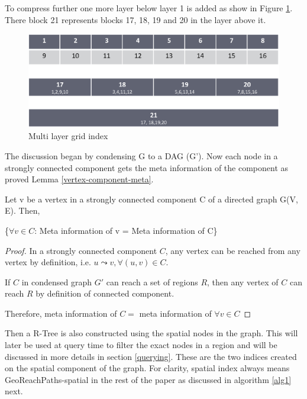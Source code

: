 To compress further one more layer below layer 1 is added as show in Figure \ref{fig:multi-grid2}. There block 21 represents blocks 17, 18, 19 and 20 in the layer above it. 

\begin{figure}[t]
    \centering
    \includegraphics[width=0.88\linewidth]{images/multi_layer_grid_index.eps}
    \caption{Multi layer grid index}
    \label{fig:multi-grid2}
\end{figure}

The discussion began by condensing G to a DAG (G'). Now each node in a strongly connected component gets the meta information of the component as proved Lemma \ref{vertex-component-meta}.

\begin{lemma}
\label{vertex-component-meta}
Let v be a vertex in a strongly connected component C of a directed graph G(V, E). Then,

{\{$\forall v \in C$: Meta information of v = Meta information of C\}}\\
\end{lemma}

\begin{proof}
In a strongly connected component $C$, any vertex can be reached from any vertex by definition, i.e. $u \leadsto v, \forall (u, v) \in C$. 

If $C$ in condensed graph $G'$ can reach a set of regions $R$, then any vertex of $C$ can reach $R$ by definition of connected component.

Therefore, meta information of $C =$ meta information of $\forall v \in C$
\end{proof}

Then a R-Tree is also constructed using the spatial nodes in the graph. This will later be used at query time to filter the exact nodes in a region and will be discussed in more details in section \ref{querying}. These are the two indices created on the spatial component of the graph. For clarity, spatial index always means GeoReachPaths-spatial in the rest of the paper as discussed in algorithm \ref{alg1} next.

